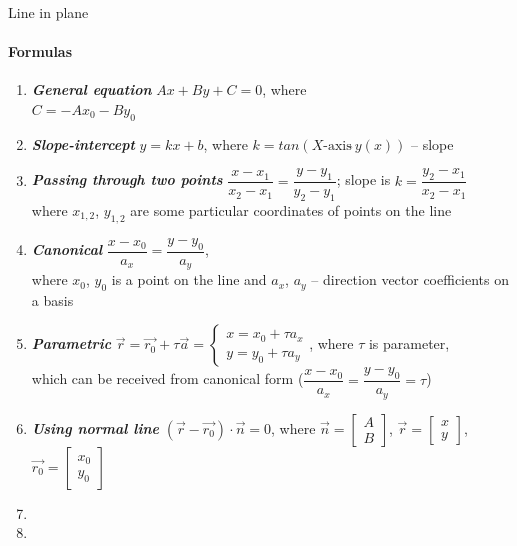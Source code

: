 \documentclass[aspectratio=169]{beamer}
\begin{document}
\begin{frame}[t]{Line in plane}
\framesubtitle{Formulas}
\scriptsize
\vspace{-0.4cm}
\begin{multicols}{2}
    \begin{enumerate}
        \item \textbf{\textit{General equation}} $Ax + By + C = 0$, where \\ $C = -Ax_0 - By_0$
        \item \textbf{\textit{Slope-intercept}} $y = kx + b$, where $k = tan(X\text{-axis} \hat{\ }y(x))$ -- slope
         \item \textbf{\textit{Passing through two points}} $\dfrac{x-x_1}{x_2-x_1} = \dfrac{y-y_1}{y_2-y_1}$; slope is $k = \dfrac{y_2-x_1}{x_2-x_1}$\\ where $x_{1,2}$, $y_{1,2}$ are some particular coordinates of points on the line
        \item \textbf{\textit{Canonical}} $\dfrac{x-x_0}{a_x} = \dfrac{y-y_0}{a_y}$,\\ where $x_0$, $y_0$ is a point on the line and $a_x$, $a_y$ -- direction vector coefficients on a basis
        \item \textbf{\textit{Parametric}} $\vec{r} = \vec{r_0} + \tau \vec{a}=\left\{\begin{matrix} x = x_0 + \tau a_x 
    \\ y = y_0 + \tau a_y 
    \end{matrix}\right.$, where $\tau$ is parameter,\\ which can be received from canonical form ($\dfrac{x-x_0}{a_x} = \dfrac{y-y_0}{a_y} = \tau$)
        \item \textbf{\textit{Using normal line}} $(\vec{r} - \vec{r_0}) \cdot \vec{n} = 0$, where $\vec{n} = \begin{bmatrix}A\\B \end{bmatrix}$, $\vec{r} = \begin{bmatrix}x\\y \end{bmatrix}$, $\vec{r_0} = \begin{bmatrix}x_0\\y_0 \end{bmatrix}$
        \item[\vspace{\fill}]
        \item[\vspace{\fill}]
    \end{enumerate}
\end{multicols}
\end{frame}
\end{document}
